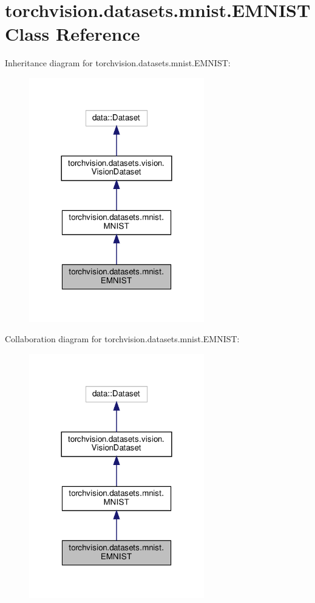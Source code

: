 \hypertarget{classtorchvision_1_1datasets_1_1mnist_1_1EMNIST}{}\section{torchvision.\+datasets.\+mnist.\+E\+M\+N\+I\+ST Class Reference}
\label{classtorchvision_1_1datasets_1_1mnist_1_1EMNIST}


Inheritance diagram for torchvision.\+datasets.\+mnist.\+E\+M\+N\+I\+ST\+:
\nopagebreak
\begin{figure}[H]
\begin{center}
\leavevmode
\includegraphics[width=216pt]{classtorchvision_1_1datasets_1_1mnist_1_1EMNIST__inherit__graph}
\end{center}
\end{figure}


Collaboration diagram for torchvision.\+datasets.\+mnist.\+E\+M\+N\+I\+ST\+:
\nopagebreak
\begin{figure}[H]
\begin{center}
\leavevmode
\includegraphics[width=216pt]{classtorchvision_1_1datasets_1_1mnist_1_1EMNIST__coll__graph}
\end{center}
\end{figure}

